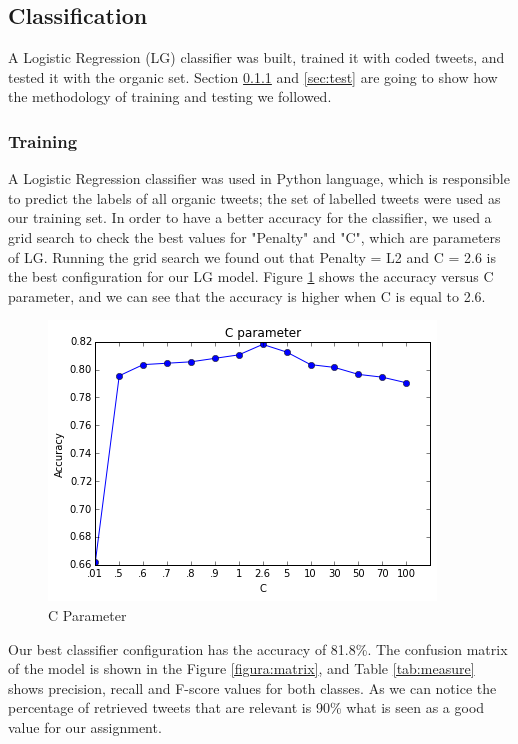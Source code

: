 \documentclass{sig-alternate}
\begin{document}
\subsection{Classification}

A Logistic Regression (LG) classifier was built, trained it with coded tweets, and tested it with the organic set. Section \ref{sec:train} and \ref{sec:test} are going to show how the methodology of training and testing we followed.

\subsubsection{Training}
\label{sec:train}

A Logistic Regression classifier was used in Python language, which is responsible to predict the labels of all organic tweets; the set of labelled tweets were used as our training set. In order to have a better accuracy for the classifier, we used a grid search to check the best values for "Penalty" and "C", which are parameters of LG. Running the grid search we found out that Penalty = L2 and C = 2.6 is the best configuration for our LG model. Figure \ref{figura:para} shows the accuracy versus C parameter, and we can see that the accuracy is higher when C is equal to 2.6.

\begin{figure}[t]
\includegraphics[width=\columnwidth]{C_parameter.png}
\centering
\caption{C Parameter}
\label{figura:para}
\end{figure}

Our best classifier configuration has the accuracy of 81.8\%. The confusion matrix of the model is shown in the Figure \ref{figura:matrix}, and Table \ref{tab:measure} shows precision, recall and F-score values for both classes. As we can notice the percentage of retrieved tweets that are relevant is 90\% what is seen as a good value for our assignment.
\end{document}
